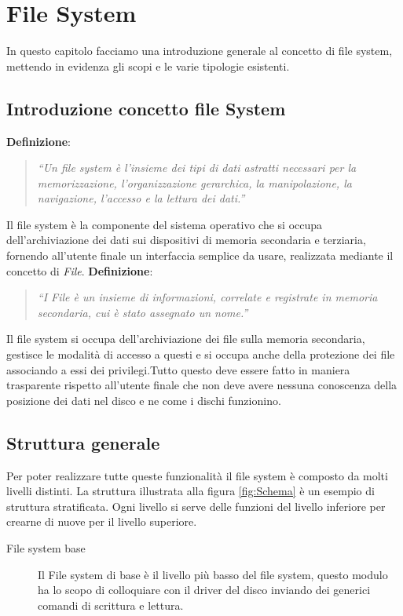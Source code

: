 \chapter{File System}
\label{cap:FileSystem}
In questo capitolo facciamo una introduzione generale al concetto di
file system, mettendo in evidenza gli scopi e le varie
tipologie esistenti.
	\section{Introduzione concetto file System }
        	{\bf Definizione}: 
                \begin{quote}
		\textit{``Un file system è l'insieme dei tipi di dati
           astratti necessari per la memorizzazione, l'organizzazione
           gerarchica, la manipolazione, la navigazione, l'accesso e
           la lettura dei dati.''}
		\end{quote}
         Il file system è la componente del sistema operativo che si
         occupa dell'archiviazione dei dati sui dispositivi di
         memoria secondaria e terziaria, fornendo all'utente finale
         un interfaccia semplice da usare, realizzata mediante il
         concetto di \emph{File}.
         \newline \newline
               {\bf    Definizione}: 
	        \begin{quote}
                \textit{``I File è un insieme di informazioni, correlate e
           registrate in memoria secondaria, cui è stato assegnato un
           nome.''}
         \end{quote}
         Il file system si occupa dell'archiviazione dei file sulla
         memoria secondaria, gestisce le modalità di accesso a questi
         e si occupa anche della protezione dei file associando a essi
         dei privilegi.Tutto questo deve essere fatto in maniera
         trasparente rispetto all'utente finale che non deve avere
         nessuna conoscenza della posizione dei dati nel disco e ne
         come i dischi funzionino.
         \section{Struttura generale}
	 Per poter realizzare tutte queste funzionalità il file
         system è composto da molti livelli distinti. La struttura
         illustrata alla figura \ref{fig:Schema} è un esempio di struttura
         stratificata. Ogni livello si serve delle funzioni del
         livello inferiore per crearne di nuove per il livello
         superiore. 
		\begin{description}
		\item[File system base] Il File system di base è il livello più basso del file
		 system, questo modulo ha lo scopo di colloquiare con il
		 driver del disco inviando dei generici comandi di scrittura e
		 lettura. 
 		\end{description}
        
